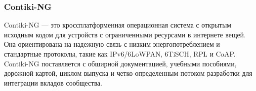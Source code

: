 






\subsubsection{Contiki-NG}

Contiki-NG \cite{Contiki_github} --- это кроссплатформенная операционная система с открытым исходным кодом для устройств с ограниченными ресурсами в интернете вещей. Она ориентирована на надежную связь с низким энергопотреблением и стандартные протоколы, такие как IPv6/6LoWPAN, 6TiSCH, RPL и CoAP. Contiki-NG поставляется с обширной документацией, учебными пособиями, дорожной картой, циклом выпуска и четко определенным потоком разработки для интеграции вкладов сообщества.

